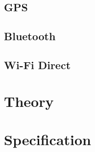 \documentclass[11pt, twocolumn]{article}
\begin{document}
\subsection{GPS}\label{sec:gps} %



\subsection{Bluetooth}\label{sec:bluetooth} %


\subsection{Wi-Fi Direct}\label{sec:wifi-direct} %


\section{Theory}\label{sec:theory} %




\section{Specification}\label{sec:specification} %






\end{document}
